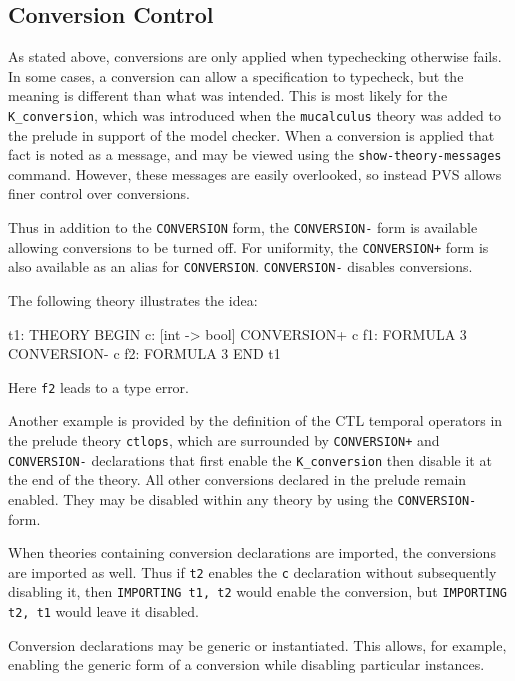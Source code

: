 \subsection{Conversion Control}

As stated above, conversions are only applied when typechecking otherwise
fails.  In some cases, a conversion can allow a specification to
typecheck, but the meaning is different than what was intended.  This is
most likely for the \texttt{K\_conversion}, which was introduced when the
\texttt{mucalculus} theory was added to the prelude in support of the
model checker.  When a conversion is applied that fact is noted as a
message, and may be viewed using the \texttt{show-theory-messages}
command.  However, these messages are easily overlooked, so instead PVS
allows finer control over conversions.

Thus in addition to the \texttt{CONVERSION} form, the \texttt{CONVERSION-}
form is available allowing conversions to be turned off.  For uniformity,
the \texttt{CONVERSION+} form is also available as an alias for
\texttt{CONVERSION}.  \texttt{CONVERSION-} disables conversions.

The following theory illustrates the idea:
\begin{session}
  t1: THEORY
  BEGIN
   c: [int -> bool]
   CONVERSION+ c
   f1: FORMULA 3
   CONVERSION- c
   f2: FORMULA 3
  END t1
\end{session}
Here \texttt{f2} leads to a type error.

Another example is provided by the definition of the CTL temporal
operators in the prelude theory \texttt{ctlops}, which are surrounded by
\texttt{CONVERSION+} and \texttt{CONVERSION-} declarations that first
enable the \texttt{K\_conversion} then disable it at the end of the
theory.  All other conversions declared in the prelude remain enabled.
They may be disabled within any theory by using the \texttt{CONVERSION-}
form.

When theories containing conversion declarations are imported, the
conversions are imported as well.  Thus if \texttt{t2} enables the
\texttt{c} declaration without subsequently disabling it, then
\texttt{IMPORTING t1, t2} would enable the conversion, but
\texttt{IMPORTING t2, t1} would leave it disabled.

Conversion declarations may be generic or instantiated.  This
allows, for example, enabling the generic form of a conversion while
disabling particular instances.

